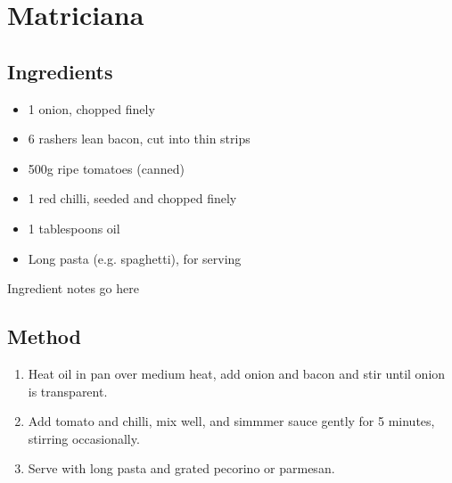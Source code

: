 \clearpage
\section{Matriciana}


\subsection{Ingredients}

\begin{itemize}
    \item 1 onion, chopped finely
    \item 6 rashers lean bacon, cut into thin strips
    \item 500g ripe tomatoes (canned)
    \item 1 red chilli, seeded and chopped finely
    \item 1 tablespoons oil
    \item Long pasta (e.g. spaghetti), for serving
\end{itemize}

Ingredient notes go here

\subsection{Method}

\begin{enumerate}
    \item Heat oil in pan over medium heat, add onion and bacon and stir until onion is transparent.
    \item Add tomato and chilli, mix well, and simmmer sauce gently for 5 minutes, stirring occasionally.
    \item Serve with long pasta and grated pecorino or parmesan.
\end{enumerate}
